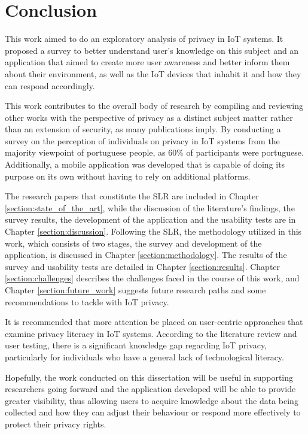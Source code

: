 %
%
\section{Conclusion}\label{section:conclusion}

This work aimed to do an exploratory analysis of privacy in IoT systems.
It proposed a survey to better understand user's knowledge on this subject
and an application that aimed to create more user awareness and better inform
them about their environment, as well as the IoT devices that inhabit it and
how they can respond accordingly.

This work contributes to the overall body of research by compiling and reviewing
other works with the perspective of privacy as a distinct subject matter rather than
an extension of security, as many publications imply. By conducting a survey
on the perception of individuals on privacy in IoT systems from the majority
viewpoint of portuguese people, as 60\% of participants were portuguese. Additionally,
a mobile application was developed that is capable of doing its purpose
on its own without having to rely on additional platforms.

The research papers that constitute
the SLR are included in Chapter \ref{section:state_of_the_art}, while the
discussion of the literature's findings, the survey results, the development of the
application and the usability tests are in Chapter \ref{section:discussion}.
Following the SLR, the methodology utilized in this work, which consists of two stages,
the survey and development of the application, is discussed in Chapter \ref{section:methodology}.
The results of the survey and usability tests are detailed in Chapter \ref{section:results}.
Chapter \ref{section:challenges} describes the challenges faced in the course of this work,
and Chapter \ref{section:future_work} suggests future research paths and
some recommendations to tackle with IoT privacy.

It is recommended that more attention be placed on user-centric approaches that
examine privacy literacy in IoT systems. According to the literature review and
user testing, there is a significant knowledge gap regarding IoT privacy, particularly
for individuals who have a general lack of technological literacy.

Hopefully, the work conducted on this dissertation will be useful in
supporting researchers going forward and the application developed will be able to
provide greater visibility, thus allowing users to acquire knowledge about
the data being collected and how they can adjust their behaviour or respond
more effectively to protect their privacy rights.
